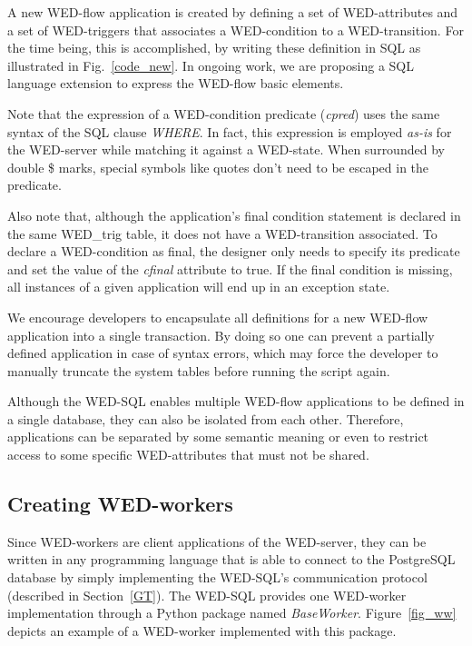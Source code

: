 \documentclass[12pt]{article}
\begin{document}
A new WED-flow application is created by defining a set of WED-attributes and a set of WED-triggers that associates a  WED-condition to a WED-transition. For the time being, this is accomplished,  by writing these definition in SQL as illustrated in Fig.~\ref{code_new}. In ongoing work, we are proposing a SQL language extension to express the WED-flow basic elements. 

\par Note that the expression of a WED-condition predicate (\emph{cpred}) uses the same syntax of the SQL clause \emph{WHERE}. In fact, this expression is employed \emph{as-is} for the WED-server while matching it against a WED-state. When surrounded by double \$ marks, special symbols like quotes don't need to be escaped in the predicate.

\par  Also note that, although the application's final condition statement is declared in the same WED\_trig table, it does not have a WED-transition associated. To declare a WED-condition as final, the designer  only needs to specify its predicate and set the value of the \emph{cfinal} attribute to true. If the final condition is missing, all instances of a given application will end up in an exception state. 

\par We encourage developers to encapsulate all definitions for a new WED-flow application into a single transaction. By doing so one can prevent a partially defined application in case of syntax errors, which may force the developer to manually truncate the system tables before running the script again. 

\par Although the WED-SQL enables multiple WED-flow applications to be defined in a single database, they can also be isolated from each other. Therefore, applications can be separated by some semantic meaning or even to restrict access to some specific  WED-attributes that must not be shared.

\subsection{Creating WED-workers}

Since WED-workers are client applications of the WED-server, they can be written in any programming language that is able to connect to the PostgreSQL database by simply implementing the WED-SQL's communication protocol (described in Section~\ref{GT}). The WED-SQL provides one WED-worker implementation through a Python package named \emph{BaseWorker}. Figure~\ref{fig_ww} depicts an example of a WED-worker implemented with this package.
\end{document}
